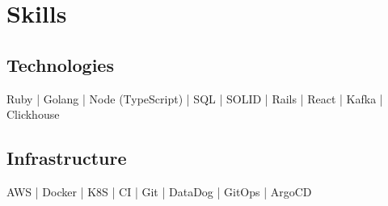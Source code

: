 
\section{Skills}
  \subsection{Technologies}
  Ruby | Golang | Node (TypeScript) | SQL | SOLID | Rails | React | Kafka | Clickhouse \\
  \subsection{Infrastructure}
  AWS | Docker | K8S | CI | Git | DataDog | GitOps | ArgoCD \\
